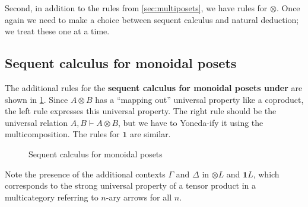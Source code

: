 \documentclass{book}
\let\types\vdash
\def\one{\mathbf{1}}
\let\tensor\otimes
\def\tensorL{\mathord{\tensor}L}
\def\tensorR{\mathord{\tensor}R}
\begin{document}
Second, in addition to the rules from \cref{sec:multiposets}, we have rules for $\tensor$.
Once again we need to make a choice between sequent calculus and natural deduction; we treat these one at a time.

\subsection{Sequent calculus for monoidal posets}
\label{sec:seqcalc-monpos}

The additional rules for the \textbf{sequent calculus for monoidal posets under \cG} are shown in \cref{fig:seqcalc-monpos}.
Since $A\tensor B$ has a ``mapping out'' universal property like a coproduct, the left rule expresses this universal property.
The right rule should be the universal relation $A,B\types A\tensor B$, but we have to Yoneda-ify it using the multicomposition.
The rules for $\one$ are similar.

\begin{figure}
  \centering
  \caption{Sequent calculus for monoidal posets}
  \label{fig:seqcalc-monpos}
\end{figure}

Note the presence of the additional contexts $\Gamma$ and $\Delta$ in $\tensorL$ and $\one L$, which corresponds to the strong universal property of a tensor product in a multicategory referring to $n$-ary arrows for all $n$.
\end{document}
